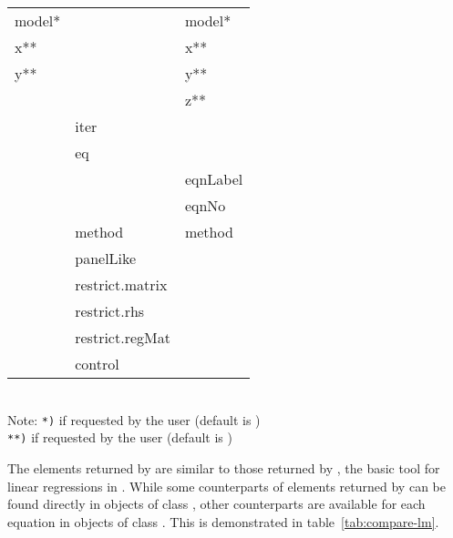 \begin{table}[htbp]
{\begin{tabular}{lll}
model*          &                & model* \\
x**             &                & x** \\
y**             &                & y** \\
                &                & z** \\
                & iter           & \\
                & eq             & \\
                &                & eqnLabel \\
                &                & eqnNo \\
                & method         & method \\
                & panelLike      & \\
                & restrict.matrix& \\
                & restrict.rhs   & \\
                & restrict.regMat& \\
                & control        & \\
\hline  \hline
\end{tabular}
}
\medskip\\
Note:
\texttt{*)} if requested by the user (default is )\\
\texttt{**)} if requested by the user (default is )
\end{table}


The elements returned by 
are similar to those returned by ,
the basic tool for linear regressions in .
While some counterparts of elements returned by 
can be found directly in objects of class ,
other counterparts are available for each equation
in objects of class .
This is demonstrated in table~\ref{tab:compare-lm}.
